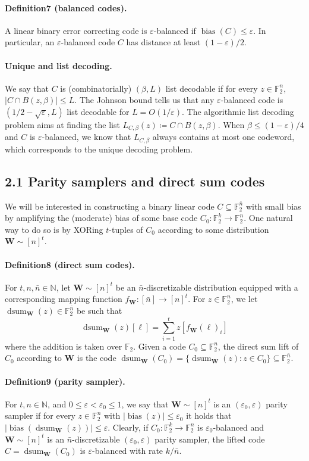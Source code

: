 \documentclass[10pt,a4paper]{article}
\DeclareMathOperator{\bias}{bias}
\DeclareMathOperator{\dsum}{dsum}
\begin{document}
\paragraph{Definition7 (balanced codes).} A linear binary error correcting code is $\varepsilon$-balanced if $\bias(C)\leq\varepsilon$. In particular, an $\varepsilon$-balanced code $C$ has distance at least $(1-\varepsilon)/2$.
\paragraph{Unique and list decoding.}
We say that $C$ is (combinatorially) $(\beta,L)$ list decodable if for every $z\in\mathbb F_2^n$, $|C\cap B(z,\beta)|\leq L$. The Johnson bound tells us that any $\varepsilon$-balanced code is $(1/2-\sqrt\varepsilon,L)$ list decodable for $L=O(1/\varepsilon)$. The algorithmic list decoding problem aims at finding the list $L_{C,\beta}(z)\coloneqq C\cap B(z,\beta)$. When $\beta\leq(1-\varepsilon)/4$ and $C$ is $\varepsilon$-balanced, we know that $L_{C,\beta}$ always contains at most one codeword, which corresponds to the unique decoding problem.
\subsection*{2.1 Parity samplers and direct sum codes}
We will be interested in constructing a binary linear code $C\subseteq\mathbb F_2^{\bar n}$ with small bias by amplifying the (moderate) bias of some base code $C_0:\mathbb F_2^k\to\mathbb F_2^n$. One natural way to do so is by XORing $t$-tuples of $C_0$ according to some distribution $\mathbf W\sim[n]^t$.
\paragraph{Definition8 (direct sum codes).} For $t,n,\bar n\in\mathbb N$, let $\mathbf W\sim[n]^t$ be an $\bar n$-discretizable distribution equipped with a corresponding mapping function $f_{\mathbf W}:[\bar n]\to[n]^t$. For $z\in\mathbb F_2^n$, we let $\dsum_{\mathbf W}(z)\in\mathbb F_2^{\bar n}$ be such that
\[\dsum_{\mathbf W}(z)[\ell]=\sum_{i=1}^t z[f_{\mathbf W}(\ell)_i]\]
where the addition is taken over $\mathbb F_2$. Given a code $C_0\subseteq\mathbb F_2^n$, the direct sum lift of $C_0$ according to $\mathbf W$ is the code $\dsum_{\mathbf W}(C_0)=\{\dsum_{\mathbf W}(z):z\in C_0\}\subseteq\mathbb F_2^{\bar n}$.
\paragraph{Definition9 (parity sampler).} For $t,n\in\mathbb N$, and $0\leq\varepsilon<\varepsilon_0\leq1$, we say that $\mathbf W\sim[n]^t$ is an $(\varepsilon_0,\varepsilon)$ parity sampler if for every $z\in\mathbb F_2^n$ with $|\bias(z)|\leq\varepsilon_0$ it holds that $|\bias(\dsum_{\mathbf W}(z))|\leq\varepsilon$.
Clearly, if $C_0:\mathbb F_2^k\to\mathbb F_2^n$ is $\varepsilon_0$-balanced and $\mathbf W\sim[n]^t$ is an $\bar n$-discretizable $(\varepsilon_0,\varepsilon)$ parity sampler, the lifted code $C=\dsum_{\mathbf W}(C_0)$ is $\varepsilon$-balanced with rate $k/\bar n$.
\end{document}
